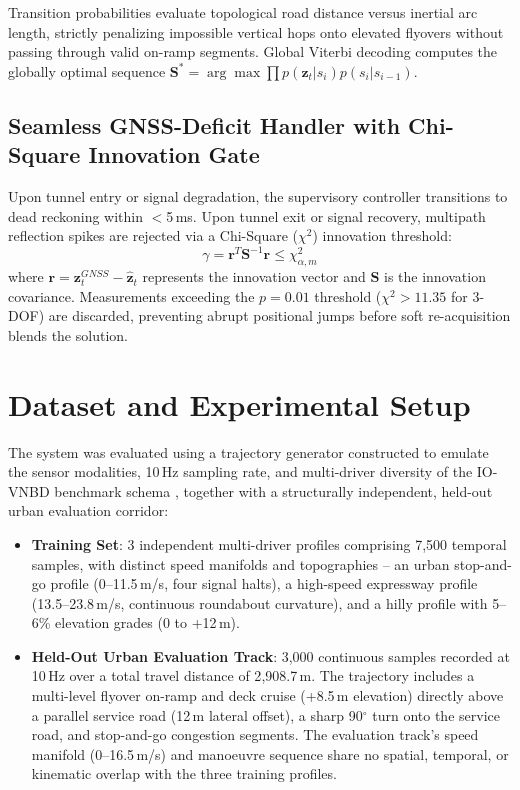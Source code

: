 \documentclass[conference]{IEEEtran}
\begin{document}
Transition probabilities evaluate topological road distance versus inertial arc length, strictly penalizing impossible vertical hops onto elevated flyovers without passing through valid on-ramp segments. Global Viterbi decoding computes the globally optimal sequence $\mathbf{S}^* = \arg\max \prod p(\mathbf{z}_t|s_i)p(s_i|s_{i-1})$.

\subsection{Seamless GNSS-Deficit Handler with Chi-Square Innovation Gate}

Upon tunnel entry or signal degradation, the supervisory controller transitions to dead reckoning within $<$5\,ms. Upon tunnel exit or signal recovery, multipath reflection spikes are rejected via a Chi-Square ($\chi^2$) innovation threshold:
\begin{equation}
\gamma = \mathbf{r}^T\mathbf{S}^{-1}\mathbf{r} \leq \chi^2_{\alpha,m}
\end{equation}
where $\mathbf{r} = \mathbf{z}_t^{GNSS} - \hat{\mathbf{z}}_t$ represents the innovation vector and $\mathbf{S}$ is the innovation covariance. Measurements exceeding the $p=0.01$ threshold ($\chi^2 > 11.35$ for 3-DOF) are discarded, preventing abrupt positional jumps before soft re-acquisition blends the solution.

\section{Dataset and Experimental Setup}

The system was evaluated using a trajectory generator constructed to emulate the sensor modalities, 10\,Hz sampling rate, and multi-driver diversity of the IO-VNBD benchmark schema \cite{onyekpe2021}, together with a structurally independent, held-out urban evaluation corridor:
\begin{itemize}
\item \textbf{Training Set}: 3 independent multi-driver profiles comprising 7,500 temporal samples, with distinct speed manifolds and topographies -- an urban stop-and-go profile (0--11.5\,m/s, four signal halts), a high-speed expressway profile (13.5--23.8\,m/s, continuous roundabout curvature), and a hilly profile with 5--6\% elevation grades (0 to +12\,m).
\item \textbf{Held-Out Urban Evaluation Track}: 3,000 continuous samples recorded at 10\,Hz over a total travel distance of 2{,}908.7\,m. The trajectory includes a multi-level flyover on-ramp and deck cruise (+8.5\,m elevation) directly above a parallel service road (12\,m lateral offset), a sharp 90$^\circ$ turn onto the service road, and stop-and-go congestion segments. The evaluation track's speed manifold (0--16.5\,m/s) and manoeuvre sequence share no spatial, temporal, or kinematic overlap with the three training profiles.
\end{itemize}
\end{document}

